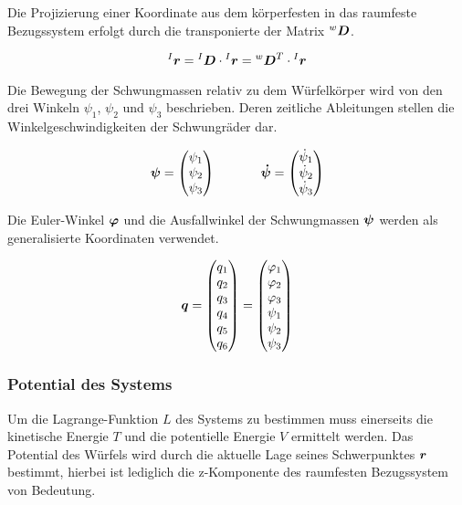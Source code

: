 Die Projizierung einer Koordinate aus dem körperfesten in das raumfeste Bezugssystem erfolgt durch die transponierte der Matrix $\prescript{w}{}{}\boldsymbol{D}$.

\begin{equation}
\prescript{I}{}{}\boldsymbol{r} = \prescript{I}{}{}\boldsymbol{D} \cdot \prescript{I}{}{}\boldsymbol{r} = \prescript{w}{}{}\boldsymbol{D}^T \cdot  \prescript{I}{}{}\boldsymbol{r}
\end{equation} 

Die Bewegung der Schwungmassen relativ zu dem Würfelkörper wird von den drei Winkeln $\psi_1$, $\psi_2$ und $\psi_3$ beschrieben. Deren zeitliche Ableitungen stellen die Winkelgeschwindigkeiten der Schwungräder dar. 

\begin{equation}
\boldsymbol{\psi} = \begin{pmatrix}
{\psi}_1 \\
{\psi}_2  \\
{\psi}_3 
\end{pmatrix}
\hspace{35pt}
\boldsymbol{\dot{\psi}} = \begin{pmatrix}
\dot{\psi}_1 \\
\dot{\psi}_2  \\
\dot{\psi}_3 
\end{pmatrix}
\end{equation}

Die Euler-Winkel $\boldsymbol{\varphi}$ und die Ausfallwinkel der Schwungmassen $\boldsymbol{\psi}$ werden als generalisierte Koordinaten verwendet.

\begin{equation}
\boldsymbol{q} = \begin{pmatrix}
q_1 \\ q_2 \\ q_3 \\ q_4 \\ q_5 \\ q_6
\end{pmatrix} =
\begin{pmatrix}
\varphi_1 \\ \varphi_2 \\ \varphi_3 \\ \psi_1 \\ \psi_2 \\ \psi_3
\end{pmatrix}
\end{equation}

\subsubsection{Potential des Systems}
Um die Lagrange-Funktion $L$ des Systems zu bestimmen muss einerseits die kinetische Energie $T$ und die potentielle Energie $V$ ermittelt werden. Das Potential des Würfels wird durch die aktuelle Lage seines Schwerpunktes $\boldsymbol{r}$ bestimmt, hierbei ist lediglich die z-Komponente des raumfesten Bezugssystem von Bedeutung.

